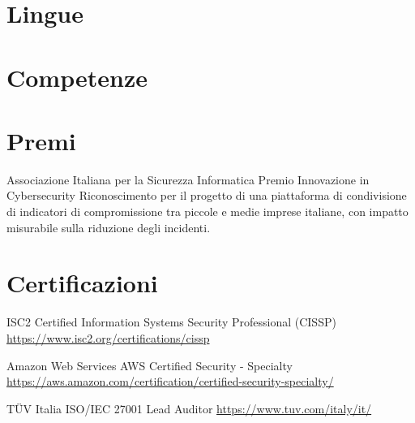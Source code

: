 \documentclass[a4paper, serif, 10pt]{moderncv}
\begin{document}
\section{Lingue}

\section{Competenze}

\section{Premi}

        {Associazione Italiana per la Sicurezza Informatica}
        {Premio Innovazione in Cybersecurity}
        {}
        {}
        {Riconoscimento per il progetto di una piattaforma di condivisione di indicatori di compromissione tra piccole e medie imprese italiane, con impatto misurabile sulla riduzione degli incidenti.}
\section{Certificazioni}

        {ISC2}
        {Certified Information Systems Security Professional (CISSP)}
        {\url{https://www.isc2.org/certifications/cissp}}
        {}
        {}

        {Amazon Web Services}
        {AWS Certified Security - Specialty}
        {\url{https://aws.amazon.com/certification/certified-security-specialty/}}
        {}
        {}

        {TÜV Italia}
        {ISO/IEC 27001 Lead Auditor}
        {\url{https://www.tuv.com/italy/it/}}
        {}
        {}
\end{document}
